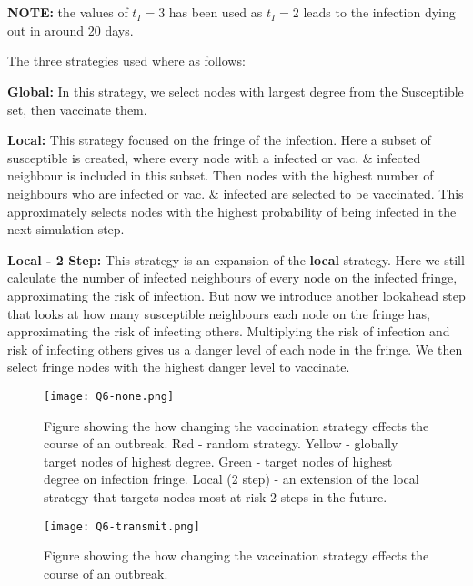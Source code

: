 \section{}
\textbf{NOTE: } the values of $t_I=3$ has been used as $t_I=2$ leads to the infection dying out in around 20 days.

The three strategies used where as follows:

\textbf{Global:} In this strategy, we select nodes with largest degree from the Susceptible set, then vaccinate them.

\textbf{Local:} This strategy focused on the fringe of the infection.
Here a subset of susceptible is created, where every node with a infected or vac. \& infected neighbour is included in this subset.
Then nodes with the highest number of neighbours who are infected or vac. \& infected are selected to be vaccinated.
This approximately selects nodes with the highest probability of being infected in the next simulation step.

\textbf{Local - 2 Step:} This strategy is an expansion of the \textbf{local} strategy. 
Here we still calculate the number of infected neighbours of every node on the infected fringe, approximating the risk of infection.
But now we introduce another lookahead step that looks at how many susceptible neighbours each node on the fringe has, approximating the risk of infecting others.
Multiplying the risk of infection and risk of infecting others gives us a danger level of each node in the fringe.
We then select fringe nodes with the highest danger level to vaccinate.  

\begin{figure}[h!]
    \begin{center}
        \texttt{[image: Q6-none.png]}
        \caption{Figure showing the how changing the vaccination strategy effects the course of an outbreak. Red - random strategy. Yellow - globally target nodes of highest degree. Green - target nodes of highest degree on infection fringe. Local (2 step) - an extension of the local strategy that targets nodes most at risk 2 steps in the future.} 
        \label{fig:q6-none}
    \end{center}
\end{figure}


\begin{figure}[h!]
    \begin{center}
        \texttt{[image: Q6-transmit.png]}
        \caption{Figure showing the how changing the vaccination strategy effects the course of an outbreak.} 
        \label{fig:q6-transmit}
    \end{center}
\end{figure}


